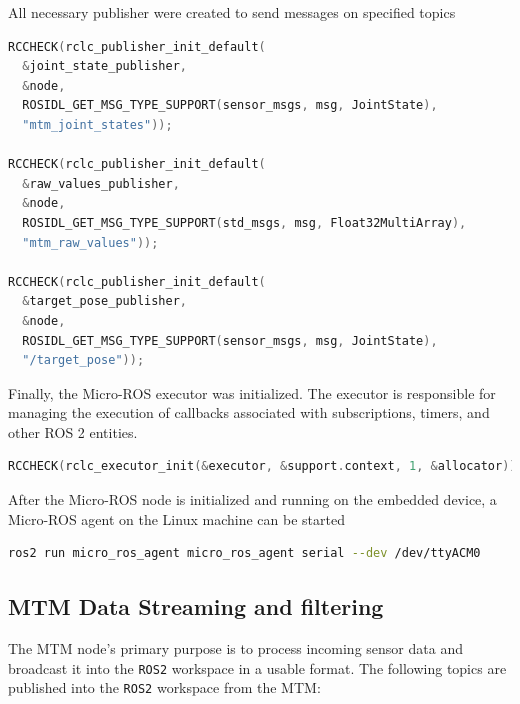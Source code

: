 All necessary publisher were created to send messages on specified topics
\begin{lstlisting}[language=C++, caption={Initialize Micro-ROS Publishers}, label={lst:microros_publishers}]
RCCHECK(rclc_publisher_init_default(
  &joint_state_publisher,
  &node,
  ROSIDL_GET_MSG_TYPE_SUPPORT(sensor_msgs, msg, JointState),
  "mtm_joint_states"));

RCCHECK(rclc_publisher_init_default(
  &raw_values_publisher,
  &node,
  ROSIDL_GET_MSG_TYPE_SUPPORT(std_msgs, msg, Float32MultiArray),
  "mtm_raw_values"));

RCCHECK(rclc_publisher_init_default(
  &target_pose_publisher,
  &node,
  ROSIDL_GET_MSG_TYPE_SUPPORT(sensor_msgs, msg, JointState),
  "/target_pose"));
\end{lstlisting}

Finally, the Micro-ROS executor was initialized. The executor is responsible for managing the execution of callbacks associated with subscriptions, timers, and other ROS 2 entities.
\begin{lstlisting}[language=C++, caption={Initialize Micro-ROS Executor}, label={lst:microros_executor_init}]
RCCHECK(rclc_executor_init(&executor, &support.context, 1, &allocator));
\end{lstlisting}


After the Micro-ROS node is initialized and running on the embedded device, a Micro-ROS agent on the Linux machine can be started
\begin{lstlisting}[language=bash, caption={Run Micro-ROS Agent Command}, label={lst:microros_agent_command}]
ros2 run micro_ros_agent micro_ros_agent serial --dev /dev/ttyACM0
\end{lstlisting}


\subsection{MTM Data Streaming and filtering}

The MTM node's primary purpose is to process incoming sensor data and broadcast it into the \texttt{ROS2} workspace in a usable format. The following topics are published into the \texttt{ROS2} workspace from the MTM:

